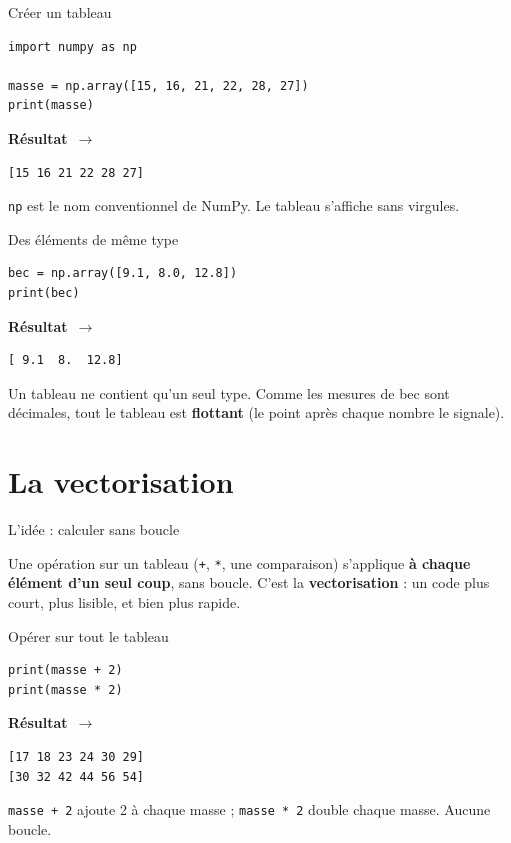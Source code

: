\documentclass[aspectratio=169,11pt]{beamer}
\newcommand{\resultat}{{\scriptsize\textbf{R\'esultat}~$\rightarrow$}\par\vspace{1pt}}
\begin{document}
\begin{frame}[fragile]{Créer un tableau}
\begin{lstlisting}
import numpy as np

masse = np.array([15, 16, 21, 22, 28, 27])
print(masse)
\end{lstlisting}
\resultat
\begin{lstlisting}[style=out]
[15 16 21 22 28 27]
\end{lstlisting}
{\small \texttt{np} est le nom conventionnel de NumPy. Le tableau s'affiche sans virgules.}
\end{frame}

\begin{frame}[fragile]{Des éléments de même type}
\begin{lstlisting}
bec = np.array([9.1, 8.0, 12.8])
print(bec)
\end{lstlisting}
\resultat
\begin{lstlisting}[style=out]
[ 9.1  8.  12.8]
\end{lstlisting}
{\small Un tableau ne contient qu'un seul type. Comme les mesures de bec sont décimales, tout le tableau est \textbf{flottant} (le point après chaque nombre le signale).}
\end{frame}

\section{La vectorisation}

\begin{frame}{L'idée : calculer sans boucle}
\begin{ucaddef}
{\small Une opération sur un tableau (\texttt{+}, \texttt{*}, une comparaison) s'applique \textbf{à chaque élément d'un seul coup}, sans boucle. C'est la \textbf{vectorisation} : un code plus court, plus lisible, et bien plus rapide.}
\end{ucaddef}
\end{frame}

\begin{frame}[fragile]{Opérer sur tout le tableau}
\begin{lstlisting}
print(masse + 2)
print(masse * 2)
\end{lstlisting}
\resultat
\begin{lstlisting}[style=out]
[17 18 23 24 30 29]
[30 32 42 44 56 54]
\end{lstlisting}
{\small \texttt{masse + 2} ajoute 2 à chaque masse ; \texttt{masse * 2} double chaque masse. Aucune boucle.}
\end{frame}
\end{document}
